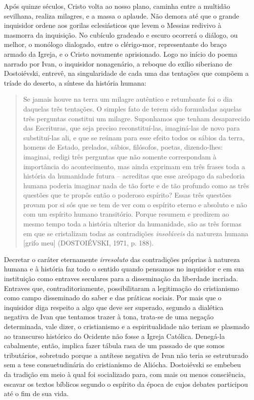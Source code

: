 Após quinze séculos, Cristo volta ao nosso plano, caminha entre a
multidão sevilhana, realiza milagres, e a massa o aplaude. Não demora
até que o grande inquisidor ordene aos gorilas eclesiásticos que levem o
Messias redivivo à masmorra da inquisição. No cubículo gradeado e escuro
ocorrerá o diálogo, ou melhor, o monólogo dialogado, entre o
clérigo-mor, representante do braço armado da Igreja, e o Cristo
novamente aprisionado. Logo no início do poema narrado por Ivan, o
inquisidor nonagenário, a reboque do exílio siberiano de Dostoiévski,
entrevê, na singularidade de cada uma das tentações que compõem a tríade
do deserto, a síntese da história humana:

\begin{quote}
Se jamais houve na terra um milagre autêntico e retumbante foi o dia
daquelas três tentações. O simples fato de terem sido formuladas aquelas
três perguntas constitui um milagre. Suponhamos que tenham desaparecido
das Escrituras, que seja preciso reconstituí-las, imaginá-las de novo
para substituí-las ali, e que se reúnam para esse efeito todos os sábios
da terra, homens de Estado, prelados, sábios, filósofos, poetas,
dizendo-lhes: imaginai, redigi três perguntas que não somente
correspondam à importância do acontecimento, mas ainda exprimam em três
frases toda a história da humanidade futura -- acreditas que esse
areópago da sabedoria humana poderia imaginar nada de tão forte e de tão
profundo como as três questões que te propôs então o poderoso espírito?
Essas três questões provam por si sós que se tem de ver com o espírito
eterno e absoluto e não com um espírito humano transitório. Porque
resumem e predizem ao mesmo tempo toda a história ulterior da
humanidade, são as três formas em que se cristalizam todas as
contradições \emph{insolúveis} da natureza humana {[}grifo meu{]}
(DOSTOIÉVSKI, 1971, p. 188).
\end{quote}

Decretar o caráter eternamente \emph{irresoluto} das contradições
próprias à natureza humana e à história faz todo o sentido quando
pensamos no inquisidor e em sua instituição como entraves seculares para
a disseminação da liberdade incriada. Entraves que, contraditoriamente,
possibilitaram a legitimação do cristianismo como campo disseminado do
saber e das práticas sociais. Por mais que o inquisidor diga respeito a
algo que deve ser superado, segundo a dialética negativa de Ivan que
tentamos trazer à tona, trata-se de uma negação determinada, vale dizer,
o cristianismo e a espiritualidade não teriam se plasmado ao transcurso
histórico do Ocidente não fosse a Igreja Católica. Denegá-la cabalmente,
então, implica fazer tábula rasa de um passado de que somos tributários,
sobretudo porque a antítese negativa de Ivan não teria se estruturado
sem a tese consuetudinária do cristianismo de Aliócha. Dostoiévski se
embebeu da tradição em meio à qual foi socializado para, com mais ou
menos consciência, escavar os textos bíblicos segundo o espírito da
época de cujos debates participou até o fim de sua vida.

